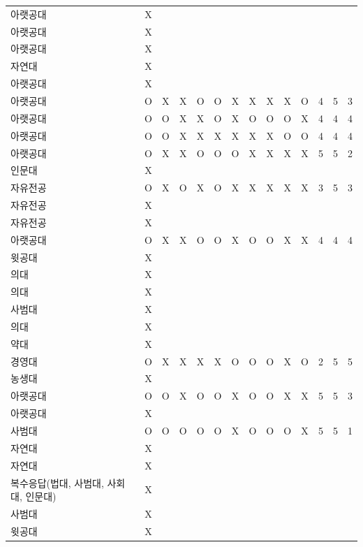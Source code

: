 \documentclass[11pt,a4paper]{article}
\begin{document}
\begin{center}
\begin{tabular}{ | p{2cm} | c | c | c | c | c | c | c | c | c | c | c | c | c | }
아랫공대 & X & & & & & & & & & & & & \\
아랫공대 & X & & & & & & & & & & & & \\
아랫공대 & X & & & & & & & & & & & & \\
자연대 & X & & & & & & & & & & & & \\
아랫공대 & X & & & & & & & & & & & & \\
아랫공대 & O & X & X & O & O & X & X & X & X & O & 4 & 5 & 3 \\
아랫공대 & O & O & X & X & O & X & O & O & O & X & 4 & 4 & 4 \\
아랫공대 & O & O & X & X & X & X & X & X & O & O & 4 & 4 & 4 \\
아랫공대 & O & X & X & O & O & O & X & X & X & X & 5 & 5 & 2 \\
인문대 & X & & & & & & & & & & & & \\
자유전공 & O & X & O & X & O & X & X & X & X & X & 3 & 5 & 3 \\
자유전공 & X & & & & & & & & & & & & \\
자유전공 & X & & & & & & & & & & & & \\
아랫공대 & O & X & X & O & O & X & O & O & X & X & 4 & 4 & 4 \\
윗공대 & X & & & & & & & & & & & & \\
의대 & X & & & & & & & & & & & & \\
의대 & X & & & & & & & & & & & & \\
사범대 & X & & & & & & & & & & & & \\
의대 & X & & & & & & & & & & & & \\
약대 & X & & & & & & & & & & & & \\
경영대 & O & X & X & X & X & O & O & O & X & O & 2 & 5 & 5 \\
농생대 & X & & & & & & & & & & & & \\
아랫공대 & O & O & X & O & O & X & O & O & X & X & 5 & 5 & 3 \\
아랫공대 & X & & & & & & & & & & & & \\
사범대 & O & O & O & O & O & X & O & O & O & X & 5 & 5 & 1 \\
자연대 & X & & & & & & & & & & & & \\
자연대 & X & & & & & & & & & & & & \\
복수응답(법대, 사범대, 사회대, 인문대) & X & & & & & & & & & & & & \\
사범대 & X & & & & & & & & & & & & \\
윗공대 & X & & & & & & & & & & & & \\

\end{tabular}
\end{center}
\end{document}
